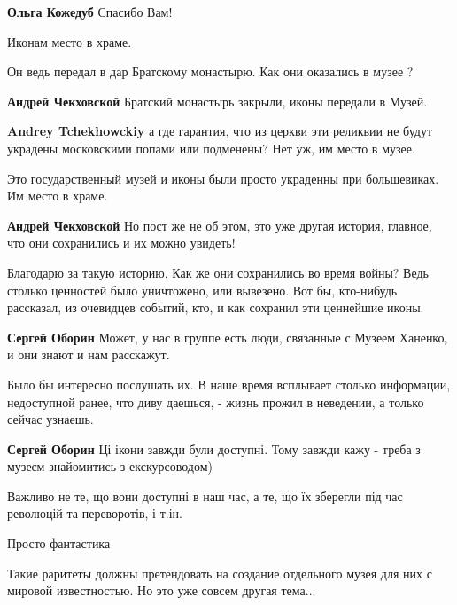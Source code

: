 \begin{itemize}
\textbf{Ольга Кожедуб} Спасибо Вам!

Иконам место в храме.

Он ведь передал в дар Братскому монастырю. Как они оказались в музее ?

\begin{itemize} %
\textbf{Андрей Чекховской} Братский монастырь закрыли, иконы передали в Музей.

\textbf{Andrey Tchekhowckiy} а где гарантия, что из церкви эти реликвии не будут украдены московскими попами или подменены? Нет уж, им место в музее.
\end{itemize} %

Это государственный музей и иконы были просто украденны при большевиках. Им место в храме.

\textbf{Андрей Чекховской} Но пост же не об этом, это уже другая история, главное, что они сохранились и их можно увидеть!


Благодарю за такую историю. Как же они сохранились во время войны? Ведь столько
ценностей было уничтожено, или вывезено. Вот бы, кто-нибудь рассказал, из
очевидцев событий, кто, и как сохранил эти ценнейшие иконы.

\begin{itemize} %
\textbf{Сергей Оборин} Может, у нас в группе есть люди, связанные с Музеем Ханенко, и они знают и нам расскажут.


Было бы интересно послушать их. В наше время всплывает столько информации,
недоступной ранее, что диву даешься, - жизнь прожил в неведении, а только
сейчас узнаешь.

\textbf{Сергей Оборин} Ці ікони завжди були доступні. Тому завжди кажу - треба з музеєм знайомитись з екскурсоводом)

Важливо не те, що вони доступні в наш час, а те, що їх зберегли під час революцій та переворотів, і т.ін.

Просто фантастика

Такие раритеты должны
претендовать на создание отдельного музея для них с мировой известностью. Но это уже совсем другая тема...


\end{itemize}
\end{itemize}
